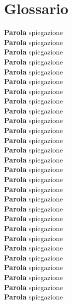 
\backmatter
\twocolumn                          %
\chapter{Glossario}\label{glos}
\linespread{1.3} \small

\noindent \textbf{Parola} spiegazione\\
\noindent \textbf{Parola} spiegazione\\
\noindent \textbf{Parola} spiegazione\\
\noindent \textbf{Parola} spiegazione\\
\noindent \textbf{Parola} spiegazione\\
\noindent \textbf{Parola} spiegazione\\
\noindent \textbf{Parola} spiegazione\\
\noindent \textbf{Parola} spiegazione\\
\noindent \textbf{Parola} spiegazione\\
\noindent \textbf{Parola} spiegazione\\
\noindent \textbf{Parola} spiegazione\\
\noindent \textbf{Parola} spiegazione\\
\noindent \textbf{Parola} spiegazione\\
\noindent \textbf{Parola} spiegazione\\
\noindent \textbf{Parola} spiegazione\\
\noindent \textbf{Parola} spiegazione\\
\noindent \textbf{Parola} spiegazione\\
\noindent \textbf{Parola} spiegazione\\
\noindent \textbf{Parola} spiegazione\\
\noindent \textbf{Parola} spiegazione\\
\noindent \textbf{Parola} spiegazione\\
\noindent \textbf{Parola} spiegazione\\
\noindent \textbf{Parola} spiegazione\\
\noindent \textbf{Parola} spiegazione\\
\noindent \textbf{Parola} spiegazione\\
\noindent \textbf{Parola} spiegazione\\
\noindent \textbf{Parola} spiegazione\\
\noindent \textbf{Parola} spiegazione\\
